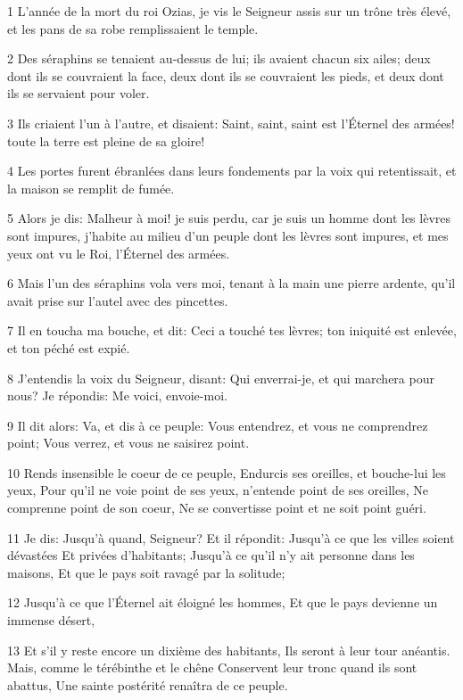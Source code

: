 \par 1 L'année de la mort du roi Ozias, je vis le Seigneur assis sur un trône très élevé, et les pans de sa robe remplissaient le temple.
\par 2 Des séraphins se tenaient au-dessus de lui; ils avaient chacun six ailes; deux dont ils se couvraient la face, deux dont ils se couvraient les pieds, et deux dont ils se servaient pour voler.
\par 3 Ils criaient l'un à l'autre, et disaient: Saint, saint, saint est l'Éternel des armées! toute la terre est pleine de sa gloire!
\par 4 Les portes furent ébranlées dans leurs fondements par la voix qui retentissait, et la maison se remplit de fumée.
\par 5 Alors je dis: Malheur à moi! je suis perdu, car je suis un homme dont les lèvres sont impures, j'habite au milieu d'un peuple dont les lèvres sont impures, et mes yeux ont vu le Roi, l'Éternel des armées.
\par 6 Mais l'un des séraphins vola vers moi, tenant à la main une pierre ardente, qu'il avait prise sur l'autel avec des pincettes.
\par 7 Il en toucha ma bouche, et dit: Ceci a touché tes lèvres; ton iniquité est enlevée, et ton péché est expié.
\par 8 J'entendis la voix du Seigneur, disant: Qui enverrai-je, et qui marchera pour nous? Je répondis: Me voici, envoie-moi.
\par 9 Il dit alors: Va, et dis à ce peuple: Vous entendrez, et vous ne comprendrez point; Vous verrez, et vous ne saisirez point.
\par 10 Rends insensible le coeur de ce peuple, Endurcis ses oreilles, et bouche-lui les yeux, Pour qu'il ne voie point de ses yeux, n'entende point de ses oreilles, Ne comprenne point de son coeur, Ne se convertisse point et ne soit point guéri.
\par 11 Je dis: Jusqu'à quand, Seigneur? Et il répondit: Jusqu'à ce que les villes soient dévastées Et privées d'habitants; Jusqu'à ce qu'il n'y ait personne dans les maisons, Et que le pays soit ravagé par la solitude;
\par 12 Jusqu'à ce que l'Éternel ait éloigné les hommes, Et que le pays devienne un immense désert,
\par 13 Et s'il y reste encore un dixième des habitants, Ils seront à leur tour anéantis. Mais, comme le térébinthe et le chêne Conservent leur tronc quand ils sont abattus, Une sainte postérité renaîtra de ce peuple.


